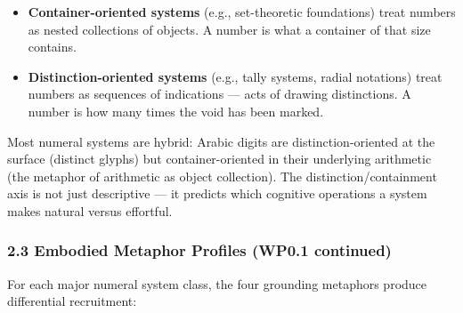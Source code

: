 \documentclass[
]{article}
\providecommand{\tightlist}{%
  \setlength{\itemsep}{0pt}\setlength{\parskip}{0pt}}
\begin{document}
\begin{itemize}
\tightlist
\item
  \textbf{Container-oriented systems} (e.g., set-theoretic foundations)
  treat numbers as nested collections of objects. A number is what a
  container of that size contains.
\item
  \textbf{Distinction-oriented systems} (e.g., tally systems, radial
  notations) treat numbers as sequences of indications --- acts of
  drawing distinctions. A number is how many times the void has been
  marked.
\end{itemize}

Most numeral systems are hybrid: Arabic digits are distinction-oriented
at the surface (distinct glyphs) but container-oriented in their
underlying arithmetic (the metaphor of arithmetic as object collection).
The distinction/containment axis is not just descriptive --- it predicts
which cognitive operations a system makes natural versus effortful.

\subsubsection{2.3 Embodied Metaphor Profiles (WP0.1
continued)}\label{embodied-metaphor-profiles-wp0.1-continued}

For each major numeral system class, the four grounding metaphors
produce differential recruitment:
\end{document}
